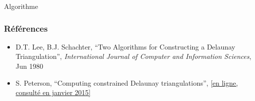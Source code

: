 \documentclass{beamer}
\begin{document}
\begin{frame}
\begin{block}{Algorithme}
\begin{overlayarea}{\textwidth}{6cm}
    \end{overlayarea}
  \end{block}
\end{frame}

\begin{frame}
  \frametitle{Références}
  \begin{itemize}
  \item D.T. Lee, B.J. Schachter, ``Two Algorithms for Constructing a Delaunay Triangulation'', \textit{International Journal of Computer and Information Sciences}, Jun 1980
  \item S. Peterson, ``Computing constrained Delaunay triangulations'', \href{http://www.geom.uiuc.edu/~samuelp/del_project.html}{[en ligne, consulté en janvier 2015]}
  \end{itemize}
\end{frame}
\end{document}

